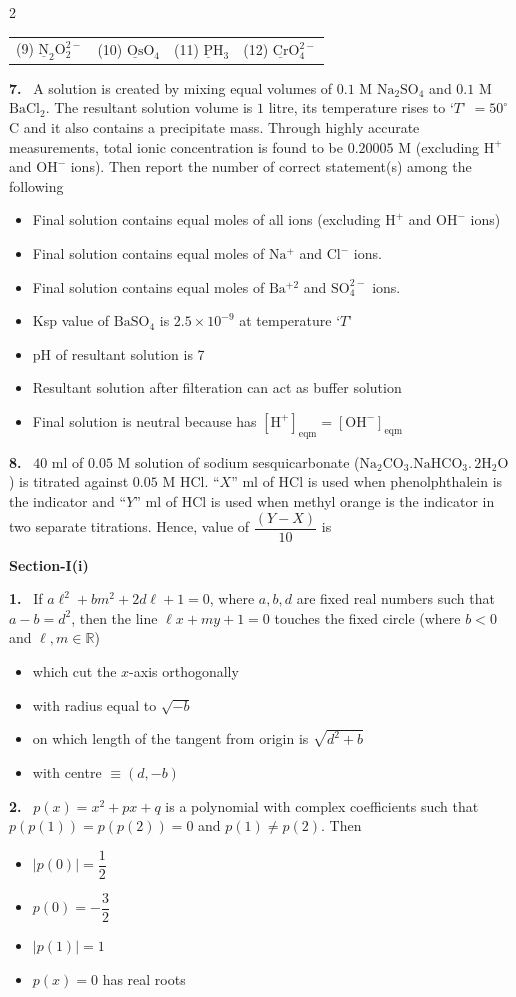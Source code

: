 \documentclass[10pt]{extarticle}
\newcommand{\partsec}[2]{\par\medskip\noindent{\large\bfseries PART-#1: #2}\par\smallskip}
\newcommand{\sect}[1]{\par\smallskip\noindent\textbf{#1}\par}
\newcommand{\qn}[1]{\par\smallskip\noindent\textbf{#1.}~}
\newenvironment{qoptions}{\begin{itemize}[leftmargin=1.8em,itemsep=1pt,topsep=2pt,label={}]}{\end{itemize}}
\newcommand{\opt}[2]{\item[(#1)] #2}
\begin{document}
\begin{multicols}{2}
\begin{center}
\begin{tabular}{@{}llll@{}}
(9) $\mathrm{\underline{N}_2O_2^{2-}}$ & (10) $\mathrm{\underline{Os}O_4}$ & (11) $\mathrm{\underline{P}H_3}$ & (12) $\mathrm{\underline{Cr}O_4^{2-}}$\\
\end{tabular}
\end{center}
\qn{7} A solution is created by mixing equal volumes of $0.1$ M $\mathrm{Na_2SO_4}$ and $0.1$ M $\mathrm{BaCl_2}$. The resultant solution volume is $1$ litre, its temperature rises to `$T$' $=50^\circ$C and it also contains a precipitate mass. Through highly accurate measurements, total ionic concentration is found to be $0.20005$ M (excluding $\mathrm{H^+}$ and $\mathrm{OH^-}$ ions). Then report the number of correct statement(s) among the following
\begin{qoptions}
\opt{A}{Final solution contains equal moles of all ions (excluding $\mathrm{H^+}$ and $\mathrm{OH^-}$ ions)}
\opt{B}{Final solution contains equal moles of $\mathrm{Na^+}$ and $\mathrm{Cl^-}$ ions.}
\opt{C}{Final solution contains equal moles of $\mathrm{Ba^{+2}}$ and $\mathrm{SO_4^{2-}}$ ions.}
\opt{D}{Ksp value of $\mathrm{BaSO_4}$ is $2.5\times10^{-9}$ at temperature `$T$'}
\opt{E}{pH of resultant solution is 7}
\opt{F}{Resultant solution after filteration can act as buffer solution}
\opt{G}{Final solution is neutral because has $[\mathrm H^+]_{\mathrm{eqm}}=[\mathrm{OH^-}]_{\mathrm{eqm}}$}
\end{qoptions}
\qn{8} $40$ ml of $0.05$ M solution of sodium sesquicarbonate ($\mathrm{Na_2CO_3.NaHCO_3.\,2H_2O}$) is titrated against $0.05$ M HCl. ``$X$'' ml of HCl is used when phenolphthalein is the indicator and ``$Y$'' ml of HCl is used when methyl orange is the indicator in two separate titrations. Hence, value of $\dfrac{(Y-X)}{10}$ is
\partsec{3}{MATHEMATICS}
\sect{Section-I(i)}
\qn{1} If $a\ell^2+bm^2+2d\ell+1=0$, where $a,b,d$ are fixed real numbers such that $a-b=d^2$, then the line $\ell x+my+1=0$ touches the fixed circle (where $b<0$ and $\ell,m\in\mathbb R$)
\begin{qoptions}
\opt{A}{which cut the $x$-axis orthogonally}
\opt{B}{with radius equal to $\sqrt{-b}$}
\opt{C}{on which length of the tangent from origin is $\sqrt{d^2+b}$}
\opt{D}{with centre $\equiv(d,-b)$}
\end{qoptions}
\qn{2} $p(x)=x^2+px+q$ is a polynomial with complex coefficients such that $p(p(1))=p(p(2))=0$ and $p(1)\neq p(2)$. Then
\begin{qoptions}
\opt{A}{$|p(0)|=\dfrac12$}
\opt{B}{$p(0)=-\dfrac32$}
\opt{C}{$|p(1)|=1$}
\opt{D}{$p(x)=0$ has real roots}

\end{qoptions}
\end{multicols}
\end{document}
